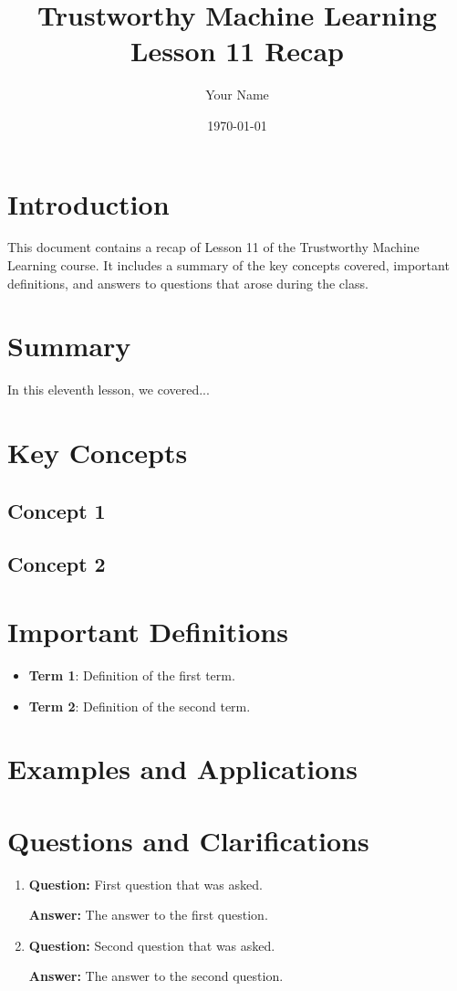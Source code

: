 \documentclass[11pt,a4paper]{article}
\title{Trustworthy Machine Learning\\
\large Lesson 11 Recap}
\author{Your Name}
\date{\today}
\newcommand{\concept}[1]{\textbf{#1}}
\begin{document}
\maketitle
\tableofcontents
\newpage

\section{Introduction}
This document contains a recap of Lesson 11 of the Trustworthy Machine Learning course. It includes a summary of the key concepts covered, important definitions, and answers to questions that arose during the class.

\section{Summary}
In this eleventh lesson, we covered...

\section{Key Concepts}
\subsection{Concept 1}

\subsection{Concept 2}

\section{Important Definitions}
\begin{itemize}
    \item \concept{Term 1}: Definition of the first term.
    \item \concept{Term 2}: Definition of the second term.
\end{itemize}

\section{Examples and Applications}

\section{Questions and Clarifications}
\begin{enumerate}
    \item \textbf{Question:} First question that was asked.
    
    \textbf{Answer:} The answer to the first question.
    
    \item \textbf{Question:} Second question that was asked.
    
    \textbf{Answer:} The answer to the second question.
\end{enumerate}
\end{document}
